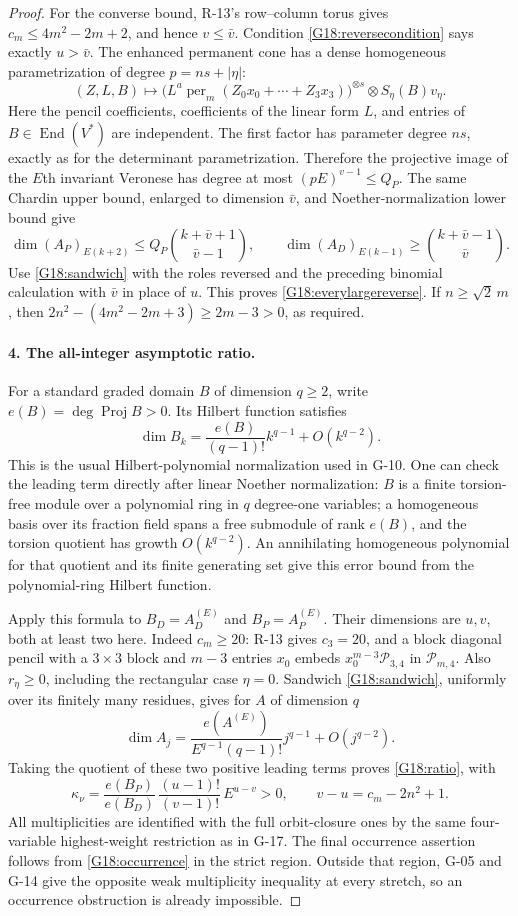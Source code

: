 \documentclass[11pt,a4paper]{article}
\theoremstyle{definition}\newtheorem{definition}{Definition}
\begin{document}
\begin{proof}
For the converse bound, R-13's row--column torus gives
$c_m\leq4m^2-2m+2$, and hence $v\leq\bar v$.
Condition \eqref{G18:reversecondition} says exactly $u>\bar v$.
The enhanced permanent cone has a dense homogeneous
parametrization of degree $p=ns+|\eta|$:
\[
 (Z,L,B)\longmapsto
 \bigl(L^a\operatorname{per}_m(Z_0x_0+\cdots+Z_3x_3)\bigr)^{\otimes s}
       \otimes S_\eta(B)v_\eta.
\]
Here the pencil coefficients, coefficients of the linear form $L$,
and entries of $B\in\operatorname{End}(V^*)$ are independent.
The first factor has parameter degree $ns$, exactly as for the
determinant parametrization. Therefore the projective image of
the $E$th invariant Veronese has degree at most
$(pE)^{v-1}\leq Q_P$. The same Chardin upper bound, enlarged to
dimension $\bar v$, and Noether-normalization lower bound give
\[
 \dim(A_P)_{E(k+2)}\leq Q_P\binom{k+\bar v+1}{\bar v-1},
 \qquad
 \dim(A_D)_{E(k-1)}\geq\binom{k+\bar v-1}{\bar v}.
\]
Use \eqref{G18:sandwich} with the roles reversed and the preceding
binomial calculation with $\bar v$ in place of $u$.
This proves \eqref{G18:everylargereverse}. If
$n\geq\sqrt2\,m$, then
$2n^2-(4m^2-2m+3)\geq2m-3>0$, as required.

\paragraph{4. The all-integer asymptotic ratio.}
For a standard graded domain $B$ of dimension $q\geq2$, write
$e(B)=\deg\operatorname{Proj}B>0$. Its Hilbert function satisfies
\[
 \dim B_k=\frac{e(B)}{(q-1)!}k^{q-1}+O(k^{q-2}).
\]
This is the usual Hilbert-polynomial normalization used in G-10.
One can check the leading term directly after linear Noether
normalization: $B$ is a finite torsion-free module over a polynomial
ring in $q$ degree-one variables; a homogeneous basis over its
fraction field spans a free submodule of rank $e(B)$, and the
torsion quotient has growth $O(k^{q-2})$. An annihilating homogeneous
polynomial for that quotient and its finite generating set give
this error bound from the polynomial-ring Hilbert function.

Apply this formula to $B_D=A_D^{(E)}$ and $B_P=A_P^{(E)}$.
Their dimensions are $u,v$, both at least two here. Indeed
$c_m\geq20$: R-13 gives $c_3=20$, and a block diagonal pencil
with a $3\times3$ block and $m-3$ entries $x_0$ embeds
$x_0^{m-3}\mathcal P_{3,4}$ in $\mathcal P_{m,4}$.
Also $r_\eta\geq0$, including the rectangular case $\eta=0$.
Sandwich
\eqref{G18:sandwich}, uniformly over its finitely many residues,
gives for $A$ of dimension $q$
\[
 \dim A_j=\frac{e(A^{(E)})}{E^{q-1}(q-1)!}
                 j^{q-1}+O(j^{q-2}).
\]
Taking the quotient of these two positive leading terms proves
\eqref{G18:ratio}, with
\[
 \kappa_\nu=
 \frac{e(B_P)}{e(B_D)}\,
 \frac{(u-1)!}{(v-1)!}\,E^{u-v}>0,
 \qquad v-u=c_m-2n^2+1.
\]
All multiplicities are identified with the full orbit-closure
ones by the same four-variable highest-weight restriction as in
G-17. The final occurrence assertion follows from
\eqref{G18:occurrence} in the strict region. Outside that region,
G-05 and G-14 give the opposite weak multiplicity inequality at
every stretch, so an occurrence obstruction is already impossible.
\end{proof}
\end{document}

